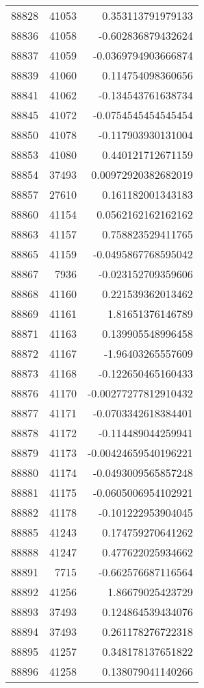 \begin{tabular}{r | r | r}
88828 & 41053 & 0.353113791979133 \\
88836 & 41058 & -0.602836879432624 \\
88837 & 41059 & -0.0369794903666874 \\
88839 & 41060 & 0.114754098360656 \\
88841 & 41062 & -0.134543761638734 \\
88845 & 41072 & -0.0754545454545454 \\
88850 & 41078 & -0.117903930131004 \\
88853 & 41080 & 0.440121712671159 \\
88854 & 37493 & 0.00972920382682019 \\
88857 & 27610 & 0.161182001343183 \\
88860 & 41154 & 0.0562162162162162 \\
88863 & 41157 & 0.758823529411765 \\
88865 & 41159 & -0.0495867768595042 \\
88867 & 7936 & -0.023152709359606 \\
88868 & 41160 & 0.221539362013462 \\
88869 & 41161 & 1.81651376146789 \\
88871 & 41163 & 0.139905548996458 \\
88872 & 41167 & -1.96403265557609 \\
88873 & 41168 & -0.122650465160433 \\
88876 & 41170 & -0.00277277812910432 \\
88877 & 41171 & -0.0703342618384401 \\
88878 & 41172 & -0.114489044259941 \\
88879 & 41173 & -0.00424659540196221 \\
88880 & 41174 & -0.0493009565857248 \\
88881 & 41175 & -0.0605006954102921 \\
88882 & 41178 & -0.101222953904045 \\
88885 & 41243 & 0.174759270641262 \\
88888 & 41247 & 0.477622025934662 \\
88891 & 7715 & -0.662576687116564 \\
88892 & 41256 & 1.86679025423729 \\
88893 & 37493 & 0.124864539434076 \\
88894 & 37493 & 0.261178276722318 \\
88895 & 41257 & 0.348178137651822 \\
88896 & 41258 & 0.138079041140266 \\

\end{tabular}
